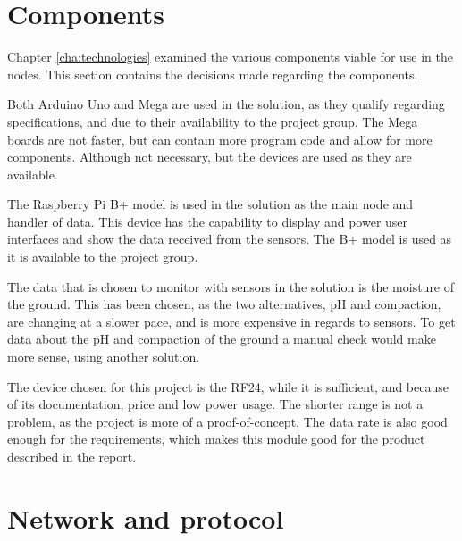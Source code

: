 \section{Components}
Chapter \ref{cha:technologies} examined the various components viable for use in the nodes. This section contains the decisions made regarding the components.

Both Arduino Uno and Mega are used in the solution, as they qualify regarding specifications, and due to their availability to the project group. The Mega boards are not faster, but can contain more program code and allow for more components. Although not necessary, but the devices are used as they are available.

The Raspberry Pi B+ model is used in the solution as the main node and handler of data. This device has the capability to display and power user interfaces and show the data received from the sensors. The B+ model is used as it is available to the project group.

The data that is chosen to monitor with sensors in the solution is the moisture of the ground. This has been chosen, as the two alternatives, pH and compaction, are changing at a slower pace, and is more expensive in regards to sensors. To get data about the pH and compaction of the ground a manual check would make more sense, using another solution. 

The device chosen for this project is the RF24, while it is sufficient, and because of its documentation, price and low power usage. The shorter range is not a problem, as the project is more of a proof-of-concept. The data rate is also good enough for the requirements, which makes this module good for the product described in the report.



\section{Network and protocol}
